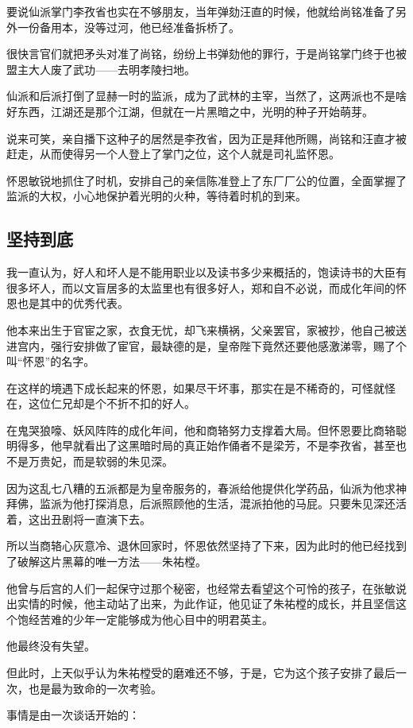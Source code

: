 \begin{multicols}{\theparacolNo}
要说仙派掌门李孜省也实在不够朋友，当年弹劾汪直的时候，他就给尚铭准备了另外一份备用本，没等过河，他已经准备拆桥了。

很快言官们就把矛头对准了尚铭，纷纷上书弹劾他的罪行，于是尚铭掌门终于也被盟主大人废了武功——去明孝陵扫地。

仙派和后派打倒了显赫一时的监派，成为了武林的主宰，当然了，这两派也不是啥好东西，江湖还是那个江湖，但就在一片黑暗之中，光明的种子开始萌芽。

说来可笑，亲自播下这种子的居然是李孜省，因为正是拜他所赐，尚铭和汪直才被赶走，从而使得另一个人登上了掌门之位，这个人就是司礼监怀恩。

怀恩敏锐地抓住了时机，安排自己的亲信陈准登上了东厂厂公的位置，全面掌握了监派的大权，小心地保护着光明的火种，等待着时机的到来。

\subsection{坚持到底}
我一直认为，好人和坏人是不能用职业以及读书多少来概括的，饱读诗书的大臣有很多坏人，而以文盲居多的太监里也有很多好人，郑和自不必说，而成化年间的怀恩也是其中的优秀代表。

他本来出生于官宦之家，衣食无忧，却飞来横祸，父亲罢官，家被抄，他自己被送进宫内，强行安排做了宦官，最缺德的是，皇帝陛下竟然还要他感激涕零，赐了个叫“怀恩”的名字。

在这样的境遇下成长起来的怀恩，如果尽干坏事，那实在是不稀奇的，可怪就怪在，这位仁兄却是个不折不扣的好人。

在鬼哭狼嚎、妖风阵阵的成化年间，他和商辂努力支撑着大局。但怀恩要比商辂聪明得多，他早就看出了这黑暗时局的真正始作俑者不是梁芳，不是李孜省，甚至也不是万贵妃，而是软弱的朱见深。

因为这乱七八糟的五派都是为皇帝服务的，春派给他提供化学药品，仙派为他求神拜佛，监派为他打探消息，后派照顾他的生活，混派拍他的马屁。只要朱见深还活着，这出丑剧将一直演下去。

所以当商辂心灰意冷、退休回家时，怀恩依然坚持了下来，因为此时的他已经找到了破解这片黑幕的唯一方法——朱祐樘。

他曾与后宫的人们一起保守过那个秘密，也经常去看望这个可怜的孩子，在张敏说出实情的时候，他主动站了出来，为此作证，他见证了朱祐樘的成长，并且坚信这个饱经苦难的少年一定能够成为他心目中的明君英主。

他最终没有失望。

但此时，上天似乎认为朱祐樘受的磨难还不够，于是，它为这个孩子安排了最后一次，也是最为致命的一次考验。

事情是由一次谈话开始的：


\end{multicols}
